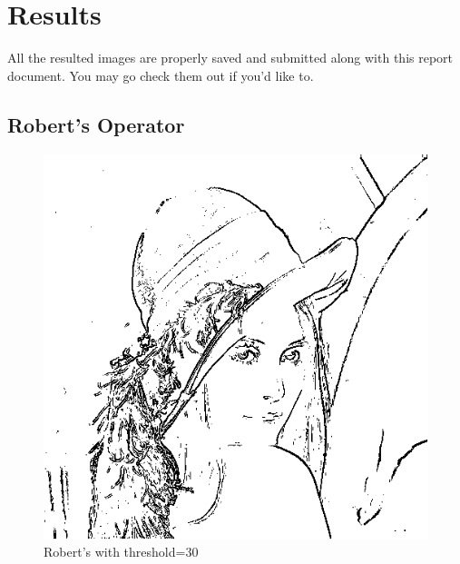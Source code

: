 \documentclass{article}
\begin{document}
\section{Results}
All the resulted images are properly saved and submitted along with this report document. You may go check them out if you'd like to.

\subsection{Robert's Operator}
\begin{figure}[H]
  \includegraphics[width=\linewidth]{img/robert_30.png}
  \caption{Robert's with threshold=30}
  \label{fig:robert_30}
\end{figure}
\end{document}
